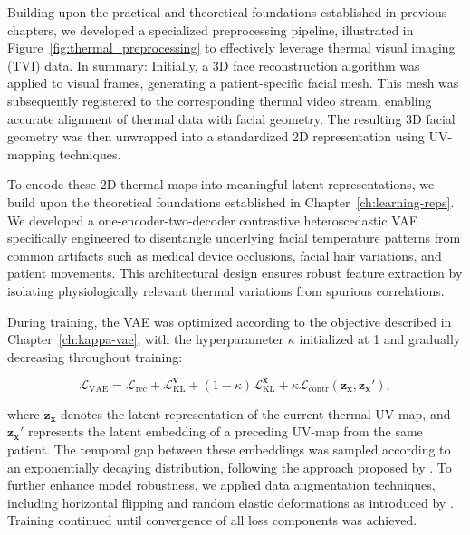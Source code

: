 Building upon the practical and theoretical foundations established in previous chapters, we developed a specialized preprocessing pipeline, illustrated in Figure~\ref{fig:thermal_preprocessing} to effectively leverage thermal visual imaging (TVI) data.
In summary: Initially, a 3D face reconstruction algorithm was applied to visual frames, generating a patient-specific facial mesh. This mesh was subsequently registered to the corresponding thermal video stream, enabling accurate alignment of thermal data with facial geometry. The resulting 3D facial geometry was then unwrapped into a standardized 2D representation using UV-mapping techniques.

To encode these 2D thermal maps into meaningful latent representations, we build upon the theoretical foundations established in Chapter~\ref{ch:learning-reps}. We developed a one-encoder-two-decoder contrastive heteroscedastic VAE specifically engineered to disentangle underlying facial temperature patterns from common artifacts such as medical device occlusions, facial hair variations, and patient movements. This architectural design ensures robust feature extraction by isolating physiologically relevant thermal variations from spurious correlations.

During training, the VAE was optimized according to the objective described in Chapter~\ref{ch:kappa-vae}, with the hyperparameter $\kappa$ initialized at 1 and gradually decreasing throughout training:

\begin{equation}
    \mathcal{L}_{\text{VAE}} = \mathcal{L}_{\text{rec}} + \mathcal{L}_{\text{KL}}^{\mathbf{v}} + (1 - \kappa) \mathcal{L}_{\text{KL}}^{\mathbf{x}} + \kappa \mathcal{L}_{\text{contr}}(\mathbf{z}_{\mathbf{x}}, \mathbf{z}_{\mathbf{x}}'),
\end{equation}

where $\mathbf{z}_{\mathbf{x}}$ denotes the latent representation of the current thermal UV-map, and $\mathbf{z}_{\mathbf{x}}'$ represents the latent embedding of a preceding UV-map from the same patient. The temporal gap between these embeddings was sampled according to an exponentially decaying distribution, following the approach proposed by \citep{qian2021spatiotemporal}. To further enhance model robustness, we applied data augmentation techniques, including horizontal flipping and random elastic deformations as introduced by \cite{ronneberger2015miccai}. Training continued until convergence of all loss components was achieved.

